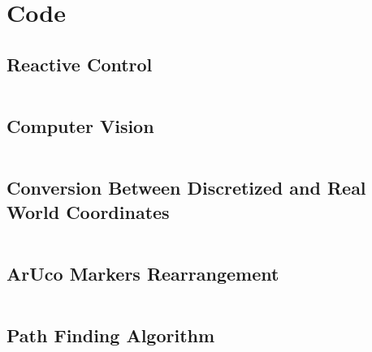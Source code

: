 \documentclass[
	12pt,
]{sty/report_style}
\newcommand{\todo}[1]{\textcolor{red}{TODO: #1}}
\begin{document}
\clearpage
\section{Code}\label{appendix:code}


\subsection*{Reactive Control}\label{appendix:reactctrl}

\inputminted{python}{py_files/reactive_control.py}

\subsection*{Computer Vision}\label{appendix:vision}

\inputminted{python}{py_files/vision.py}

\subsection*{Conversion Between Discretized and Real World Coordinates}\label{appendix:map}
\inputminted{python}{py_files/mazerunner.py}

\subsection*{ArUco Markers Rearrangement}\label{appendix:ordinator}
\inputminted{python}{py_files/ordinator.py}

\subsection*{Path Finding Algorithm}\label{appendix:astar}

\inputminted{python}{py_files/astar.py}


\end{document}

